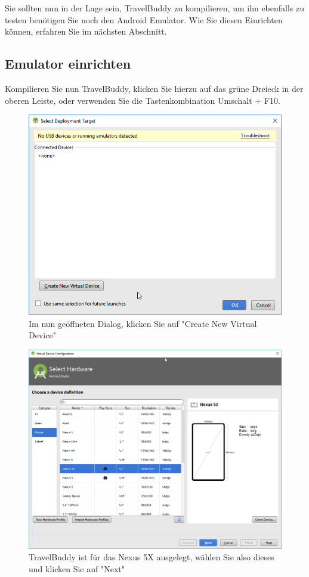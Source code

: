 \documentclass[a4paper,10pt,xetex]{article}
\begin{document}
Sie sollten nun in der Lage sein, TravelBuddy zu kompilieren, um ihn ebenfalls zu testen benötigen Sie noch den Android Emulator. Wie Sie diesen Einrichten können, erfahren Sie im nächsten Abschnitt.

\subsection{Emulator einrichten}

Kompilieren Sie nun TravelBuddy, klicken Sie hierzu auf das grüne Dreieck in der oberen Leiste, oder verwenden Sie die Tastenkombination Umschalt + F10.

\begin{figure}
  \centering
  \includegraphics[width=\textwidth]{Installation/3-0}
  \caption{Im nun geöffneten Dialog, klicken Sie auf "Create New Virtual Device"}
\end{figure}

\begin{figure}
  \centering
  \includegraphics[width=\textwidth]{Installation/3-1}
  \caption{TravelBuddy ist für das Nexus 5X ausgelegt, wählen Sie also dieses und klicken Sie auf "Next"}
\end{figure}
\end{document}
